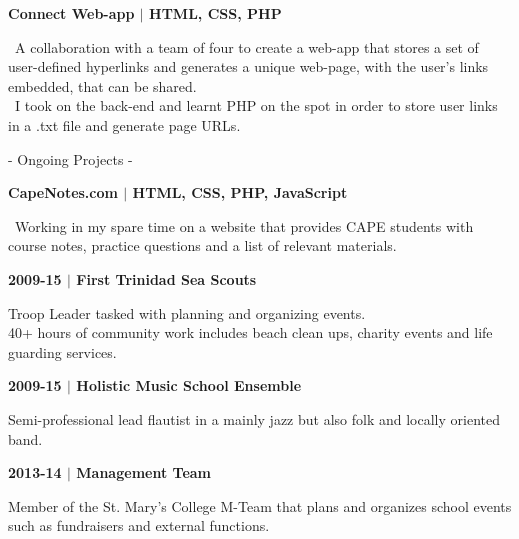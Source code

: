 \documentclass{article}
\begin{document}
\begin{minipage}[t]{0.63\textwidth}
{\sffamily\bf\small {\large Connect Web-app $|$} HTML, CSS, PHP}\par
{\small{}\selectfont\textbullet\ A collaboration with a team of four to create a web-app that stores a set of user-defined hyperlinks and generates a unique web-page, with the user's links embedded, that can be shared.\\
\textbullet\ I took on the back-end and learnt PHP on the spot in order to store user links in a .txt file and generate page URLs.}\par
\bigskip


{\LARGE\sc - Ongoing Projects -} \smallskip\par
{\sffamily\bf\small {\large CapeNotes.com $|$} HTML, CSS, PHP, JavaScript}\par
{\small{}\selectfont\textbullet\ Working in my spare time on a website that provides CAPE students with course notes, practice questions and a list of relevant materials.}\par
\bigskip


 \smallskip\par
{\sffamily\bf 2009-15 $|$ {\large First Trinidad Sea Scouts}}\par
{\small{}\selectfont Troop Leader tasked with planning and organizing events.\\
40+ hours of community work includes beach clean ups, charity events and life guarding services.}\par
{\sffamily\bf 2009-15 $|$ {\large Holistic Music School Ensemble}}\par
{\small{}\selectfont Semi-professional lead flautist in a mainly
jazz but also folk and locally oriented band.}\par
{\sffamily\bf 2013-14 $|$ {\large Management Team}}\par
{\small{}\selectfont Member of the St. Mary's College M-Team that plans and organizes school events such as fundraisers and external functions.}\par

\end{minipage}
\end{document}
